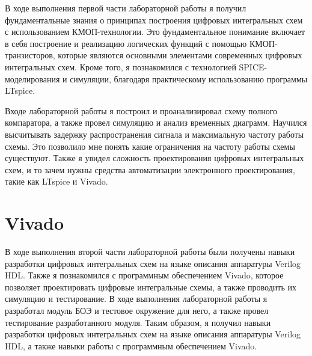 \documentclass[12pt,onecolumn]{article}
\begin{document}
В ходе выполнения первой части лабораторной работы я получил фундаментальные знания о принципах построения цифровых интегральных схем с использованием КМОП-технологии.
Это фундаментальное понимание включает в себя построение и реализацию логических функций с помощью КМОП-транзисторов, которые являются основными элементами современных цифровых интегральных схем.
Кроме того, я познакомился с технологией SPICE-моделирования и симуляции, благодаря практическому использованию программы LTspice. 

Входе лабораторной работы я построил и проанализировал схему полного компаратора, а также провел симуляцию и анализ временных диаграмм.
Научился высчитывать задержку распространения сигнала и максимальную частоту работы схемы.
Это позволило мне понять какие ограничения на частоту работы схемы существуют. 
Также я увидел сложность проектирования цифровых интегральных схем, и то зачем нужны средства автоматизации электронного проектирования, такие как LTspice и Vivado.
\section{Vivado}

В ходе выполнения второй части лабораторной работы были получены навыки разработки цифровых интегральных схем на языке описания аппаратуры Verilog HDL.
Также я познакомился с программным обеспечением Vivado, которое позволяет проектировать цифровые интегральные схемы, а также проводить их симуляцию и тестирование.
В ходе выполнения лабораторной работы я разработал модуль БОЭ и тестовое окружение для него, а также провел тестирование разработанного модуля.
Таким образом, я получил навыки разработки цифровых интегральных схем на языке описания аппаратуры Verilog HDL, а также навыки работы с программным обеспечением Vivado.
\end{document}
